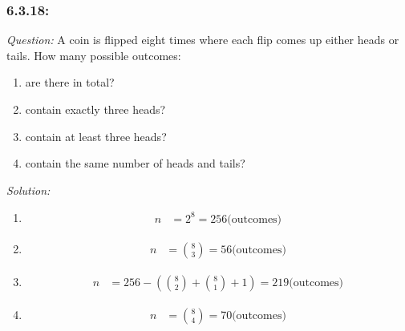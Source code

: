 \documentclass[a4paper]{article}
\begin{document}
	\subsubsection*{6.3.18:}
	\textit{Question:} A coin is flipped eight times where each flip comes up
	either heads or tails. How many possible outcomes:
	\begin{enumerate} [label = (\alph*)]
		\item are there in total?
		\item contain exactly three heads?
		\item contain at least three heads?
		\item contain the same number of heads and tails?
	\end{enumerate}
	\textit{Solution:}\\
	\begin{enumerate} [label = (\alph*)]
		\item 
		\begin{align*}
		n &= 2^{8} = 256 \text{(outcomes)}
		\end{align*}
		\item 
		\begin{align*}
		n &= {8 \choose 3} = 56 \text{(outcomes)}
		\end{align*}
		\item 
		\begin{align*}
		n &= 256 - ( {8\choose 2} + {8 \choose 1} + 1) = 219 \text{(outcomes)}
		\end{align*}
		\item 
		\begin{align*}
		n &= {8 \choose 4} = 70 \text{(outcomes)}
		\end{align*}
	\end{enumerate}
	
\end{document}
